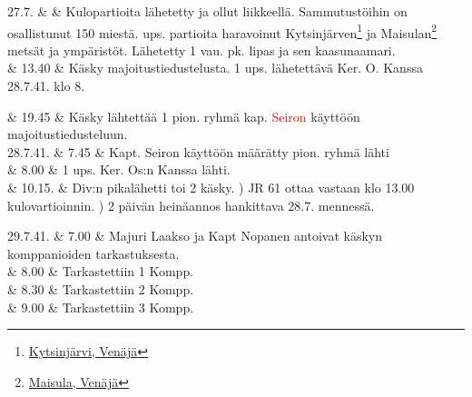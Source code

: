 \documentclass[11pt,a5paper,oneside]{book}
\begin{document}
27.7. & & Kulopartioita lähetetty ja ollut liikkeellä. Sammutustöihin on osallistunut 150 miestä.  ups. partioita haravoinut Kytsinjärven\footnote{\href{https://www.google.fi/maps/place/Kyutsin\%22Yarvi/@61.7953543,31.557194,16z/}{Kytsinjärvi, Venäjä}} ja Maisulan\footnote{\href{https://www.google.fi/maps/place/61\%C2\%B051'34.2\%22N+31\%C2\%B034'17.4\%22E/}{Maisula, Venäjä}} metsät ja ympäristöt. Lähetetty 1 vau. pk. lipas ja sen kaasunaamari. \newline\newline \\

& 13.40 & Käsky majoitustiedustelusta. 1 ups. lähetettävä Ker. O. Kanssa 28.7.41. klo 8. \\
\newpage

& 19.45 & Käsky lähtettää 1 pion. ryhmä kap. \textcolor{red}{Seiron} käyttöön majoitustiedusteluun. \newline\newline\newline\newline\newline \\

28.7.41. & 7.45 & Kapt. Seiron käyttöön määrätty pion. ryhmä lähti \newline \\

& 8.00 & 1 ups. Ker. Os:n Kanssa lähti. \\

& 10.15. & Div:n pikalähetti toi 2 käsky. ) JR 61 ottaa vastaan klo 13.00 kulovartioinnin. ) 2 päivän heinäannos hankittava 28.7. mennessä. \\

\taulustop


29.7.41. & 7.00 & Majuri Laakso ja Kapt Nopanen antoivat käskyn komppanioiden tarkastuksesta. \\

& 8.00 & Tarkastettiin 1 Kompp. \\

& 8.30 & Tarkastettiin 2 Kompp. \\

& 9.00 & Tarkastettiin 3 Kompp. \\
\end{document}
